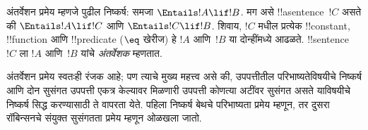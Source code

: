 \documentclass[../../../include/open-logic-section]{subfiles}
\begin{document}


अंतर्वेशन प्रमेय म्हणजे पुढील निष्कर्ष: समजा
$\Entails !A \lif !B$. मग असे !!a{sentence}~$!C$ असते की
$\Entails !A \lif !C$ आणि $\Entails !C \lif !B$. शिवाय,
$!C$ मधील प्रत्येक !!{constant}, !!{function} आणि !!{predicate}
($\eq$ खेरीज) हे $!A$ आणि~$!B$ या दोन्हींमध्ये आढळते. !!{sentence}~$!C$
ला $!A$ आणि~$!B$ यांचे \emph{अंतर्वेशक} म्हणतात.

अंतर्वेशन प्रमेय स्वतःही रंजक आहे; पण त्याचे मुख्य महत्त्व असे की,
उपपत्तीतील परिभाष्यतेविषयीचे निष्कर्ष आणि दोन सुसंगत उपपत्ती एकत्र केल्यावर
मिळणारी उपपत्ती कोणत्या अटींवर सुसंगत असते याविषयीचे निष्कर्ष सिद्ध करण्यासाठी
ते वापरता येते. पहिला निष्कर्ष बेथचे परिभाष्यता प्रमेय म्हणून, तर
दुसरा रॉबिन्सनचे संयुक्त सुसंगतता प्रमेय म्हणून ओळखला जातो.
\end{document}
